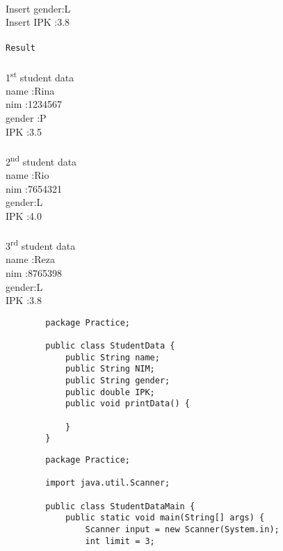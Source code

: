 \documentclass[12pt,titlepage]{article}
\begin{document}
\begin{enumerate}
    \mbox{}\\ Insert gender:L
    \mbox{}\\ Insert IPK :3.8
    \mbox{}\\ 
    \mbox{}\\ \texttt{Result} 
    \mbox{}\\ 
    \mbox{}\\ 1\textsuperscript{st} student data
    \mbox{}\\ name :Rina
    \mbox{}\\ nim :1234567
    \mbox{}\\ gender :P
    \mbox{}\\ IPK :3.5
    \mbox{}\\
    \mbox{}\\ 2\textsuperscript{nd} student data
    \mbox{}\\ name :Rio
    \mbox{}\\ nim :7654321
    \mbox{}\\ gender:L
    \mbox{}\\ IPK :4.0
    \mbox{}\\
    \mbox{}\\ 3\textsuperscript{rd} student data
    \mbox{}\\ name :Reza
    \mbox{}\\ nim :8765398
    \mbox{}\\ gender:L
    \mbox{}\\ IPK :3.8
    \mbox{}\\ 
    \begin{verbatim}
        package Practice;

        public class StudentData {
            public String name;
            public String NIM;
            public String gender;
            public double IPK;
            public void printData() {
                
            }
        }
    \end{verbatim}
    \begin{verbatim}
        package Practice;

        import java.util.Scanner;

        public class StudentDataMain {
            public static void main(String[] args) {
                Scanner input = new Scanner(System.in);
                int limit = 3;


\end{verbatim}
\end{enumerate}
\end{document}
